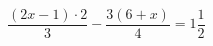 \begin{ex}[type=equation]
	\begin{condition}
		$\dfrac{(2x-1)\cdot2}{3}-\dfrac{3(6+x)}{4}=1\dfrac{1}{2}$
	\end{condition}
\end{ex}